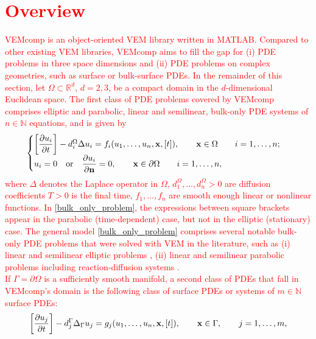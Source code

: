 \documentclass[a4paper]{article}
\newcommand{\red}[1]{\textcolor{red}{#1}}
\begin{document}
\section{\red{Overview}}
\label{sec:overview}
\red{VEMcomp is an object-oriented VEM library written in MATLAB.  Compared to other existing VEM libraries, VEMcomp aims to fill the gap for (i) PDE problems in three space dimensions and (ii) PDE problems on complex geometries, such as surface or bulk-surface PDEs. In the remainder of this section, let $\Omega \subset \mathbb{R}^d$, $d=2,3$, be a compact domain in the $d$-dimensional Euclidean space.  The first class of PDE problems covered by VEMcomp comprises elliptic and parabolic, linear and semilinear, bulk-only PDE systems of $n\in\mathbb{N}$ equations, and is given by
\begin{equation}
\label{bulk_only_problem}
\begin{cases}
\left[\dfrac{\partial u_i}{\partial t}\right] - d_i^\Omega\Delta u_i = f_i(u_1,\dots, u_n, \bold x, [t]), \qquad \bold x \in \Omega \qquad  i=1,\dots,n;\\
u_{i} = 0 \quad \text{or} \quad \dfrac{\partial u_i}{\partial \bold n} = 0,  \qquad \bold x \in \partial \Omega\qquad  i=1,\dots,n,
\end{cases}
\end{equation}
where $\Delta$ denotes the Laplace operator in $\Omega$, $d_1^\Omega,\dots, d_n^\Omega > 0$ are diffusion coefficients $T>0$ is the final time, $f_1, \dots, f_n$ are smooth enough linear or nonlinear functions. In \eqref{bulk_only_problem}, the expressions between square brackets appear in the parabolic (time-dependent) case, but not in the elliptic (stationary) case. The general model \eqref{bulk_only_problem} comprises several notable bulk-only PDE problems that were solved with VEM in the literature, such as (i) linear \cite{beirao2013basic, da2017high,da2019virtual} and semilinear elliptic problems \cite{xiao2022nonconforming},  (ii) linear \cite{vacca2015virtual} and semilinear parabolic problems \cite{adak2019convergence} including reaction-diffusion systems \cite{huang2021posteriori}.\\
If $\Gamma = \partial \Omega$ is a sufficiently smooth manifold, a second class of PDEs that fall in VEMcomp's domain is the following class of surface PDEs or systems of $m\in\mathbb{N}$ surface PDEs:
\begin{equation}
\label{surface_problems}
\left[\frac{\partial u_j}{\partial t}\right] - d_j^\Gamma \Delta_\Gamma u_j = g_j(u_1,\dots,u_n, \bold x, [t]), \qquad \bold x \in \Gamma, \qquad j=1,\dots,m,

\end{equation}}
\end{document}
